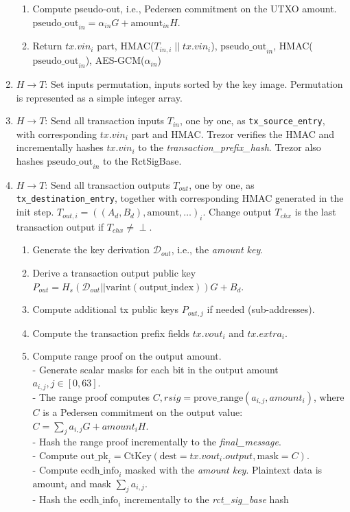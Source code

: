 \documentclass[]{article}
\begin{document}
\begin{enumerate}
\begin{enumerate}
		\item Compute pseudo-out, i.e., Pedersen commitment on the UTXO amount. $ \text{pseudo\_out}_{in} = \alpha_{in} G + \text{amount}_{in} H$.
		
		\item Return $tx.vin_i$ part, HMAC($T_{in,i} \; || \; tx.vin_i$), $\text{pseudo\_out}_{in}$, HMAC($\text{pseudo\_out}_{in}$), AES-GCM($\alpha_{in}$)
	\end{enumerate} 

	\item $H \rightarrow T$: Set inputs permutation, inputs sorted by the key image. Permutation is represented as a simple integer array.
	
	\item $H \rightarrow T$: Send all transaction inputs $T_{in}$, one by one, as \verb|tx_source_entry|, with corresponding $tx.vin_i$ part and HMAC. Trezor verifies the HMAC and incrementally hashes $tx.vin_i$ to the \emph{transaction\_prefix\_hash}. Trezor also hashes $\text{pseudo\_out}_{in}$ to the RctSigBase.
	
	\item $H \rightarrow T$: Send all transaction outputs $T_{out}$, one by one, as \verb|tx_destination_entry|, together with corresponding HMAC generated in the init step. $T_{out,i} = ((A_d, B_d), \text{amount}, \dots)_i$. Change output $T_{chx}$ is the last transaction output if $T_{chx} \neq \perp$.
	\begin{enumerate}			
		\item Generate the key derivation $\mathcal{D}_{out}$, i.e., the \emph{amount key}.
		
		\item Derive a transaction output public key $P_{out} = H_s(\mathcal{D}_{out} || \text{varint}(\text{output\_index}))G + B_d$.
		
		\item Compute additional tx public keys $P_{out,j}$ if needed (sub-addresses).
		
        \item Compute the transaction prefix fields $tx.vout_i$ and $tx.extra_i$.
        
        \item Compute range proof on the output amount. \\
        - Generate scalar masks for each bit in the output amount $a_{i, j}, j \in [0, 63]$. \\
        - The range proof computes $C, rsig = \text{prove\_range}(a_{i, j}, amount_i)$, where $C$ is a Pedersen commitment on the output value: $C = \sum_{j}a_{i, j} G + amount_i H$. \\
        - Hash the range proof incrementally to the \emph{final\_message}.\\
        - Compute $\text{out\_pk}_i = \text{CtKey}(\text{dest}=tx.vout_i.output,\text{mask}=C)$.\\  
        - Compute $\text{ecdh\_info}_i$ masked with the \emph{amount key}. Plaintext data is $\text{amount}_i$ and mask $\sum_{j}a_{i, j}$. \\ \medskip
        - Hash the $\text{ecdh\_info}_i$ incrementally to the \emph{rct\_sig\_base} hash


\end{enumerate}
\end{enumerate}
\end{document}
